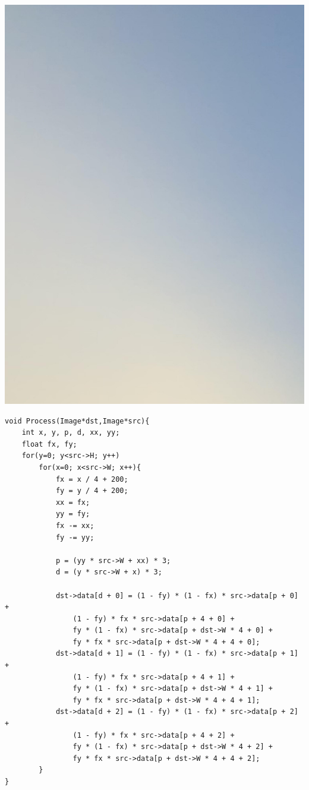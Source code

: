 \documentclass[11pt]{jarticle}
\begin{document}
\includegraphics[scale=.1]{./img/tsuyama_sousenkei.jpg}

\begin{lstlisting}
void Process(Image*dst,Image*src){
    int x, y, p, d, xx, yy;
    float fx, fy;
    for(y=0; y<src->H; y++)
        for(x=0; x<src->W; x++){
            fx = x / 4 + 200;
            fy = y / 4 + 200;
            xx = fx;
            yy = fy;
            fx -= xx;
            fy -= yy;

            p = (yy * src->W + xx) * 3;
            d = (y * src->W + x) * 3;
     
            dst->data[d + 0] = (1 - fy) * (1 - fx) * src->data[p + 0] +
                (1 - fy) * fx * src->data[p + 4 + 0] +
                fy * (1 - fx) * src->data[p + dst->W * 4 + 0] +
                fy * fx * src->data[p + dst->W * 4 + 4 + 0];
            dst->data[d + 1] = (1 - fy) * (1 - fx) * src->data[p + 1] +
                (1 - fy) * fx * src->data[p + 4 + 1] +
                fy * (1 - fx) * src->data[p + dst->W * 4 + 1] +
                fy * fx * src->data[p + dst->W * 4 + 4 + 1];
            dst->data[d + 2] = (1 - fy) * (1 - fx) * src->data[p + 2] +
                (1 - fy) * fx * src->data[p + 4 + 2] +
                fy * (1 - fx) * src->data[p + dst->W * 4 + 2] +
                fy * fx * src->data[p + dst->W * 4 + 4 + 2];
        }
}
\end{lstlisting}
\end{document}
